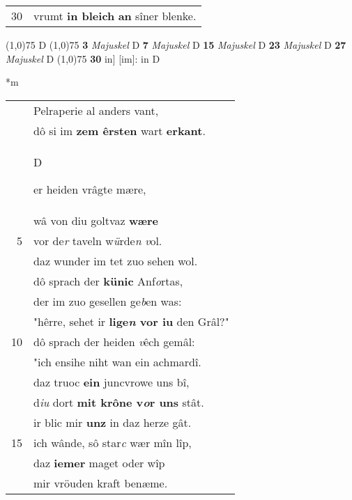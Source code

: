 \documentclass[8pt,a4paper,notitlepage]{article}
\begin{document}
\begin{table}[ht]
\begin{minipage}[t]{0.5\linewidth}
\begin{tabular}{rl}
30 & vrumt \textbf{in bleich} \textbf{an} sîner blenke.\\ 
\end{tabular}
\scriptsize
\line(1,0){75} \newline
D \newline
\line(1,0){75} \newline
\textbf{3} \textit{Majuskel} D  \textbf{7} \textit{Majuskel} D  \textbf{15} \textit{Majuskel} D  \textbf{23} \textit{Majuskel} D  \textbf{27} \textit{Majuskel} D  \newline
\line(1,0){75} \newline
\textbf{30} in] [im]: in D \newline
\end{minipage}
\hspace{0.5cm}
\begin{minipage}[t]{0.5\linewidth}
\small
\begin{center}*m
\end{center}
\begin{tabular}{rl}
 & Pelraperie al anders vant,\\ 
 & dô si im \textbf{zem êrsten} wart \textbf{erkant}.\\ 
 & \begin{large}D\end{large}er heiden vrâgte mære,\\ 
 & wâ von diu goltvaz \textbf{wære}\\ 
5 & vor de\textit{r} taveln w\textit{ü}rde\textit{n} \textit{v}ol.\\ 
 & daz wunder im tet zuo sehen wol.\\ 
 & dô sprach der \textbf{künic} Anf\textit{o}rtas,\\ 
 & der im zuo gesellen ge\textit{b}en was:\\ 
 & "hêrre, sehet ir \textbf{lige\textit{n} vor iu} den Grâl?"\\ 
10 & dô sprach der heiden \textit{v}êch gemâl:\\ 
 & "ich ensihe niht wan ein achmardî.\\ 
 & daz truoc \textbf{ein} juncvrowe uns bî,\\ 
 & d\textit{iu} dort \textbf{mit krône v\textit{o}r uns} stât.\\ 
 & ir blic mir \textbf{unz} in daz herze gât.\\ 
15 & ich wânde, sô star\textit{c} wær mîn lîp,\\ 
 & daz \textbf{iemer} maget oder wîp\\ 
 & mir vröuden kraft benæme.\\ 

\end{tabular}
\end{minipage}
\end{table}
\end{document}
